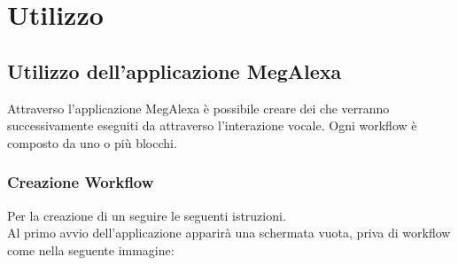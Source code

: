 \chapter{Utilizzo}
\label{Utilizzo}
\section{Utilizzo dell'applicazione MegAlexa} \label{UtilizzoApp}
Attraverso l'applicazione MegAlexa è possibile creare dei che verranno successivamente eseguiti da  attraverso l'interazione vocale. Ogni workflow è composto da uno o più blocchi.
\newpage
\subsection{Creazione Workflow}
Per la creazione di un seguire le seguenti istruzioni.\\
Al primo avvio dell'applicazione apparirà una schermata vuota, priva di workflow come nella seguente immagine:
